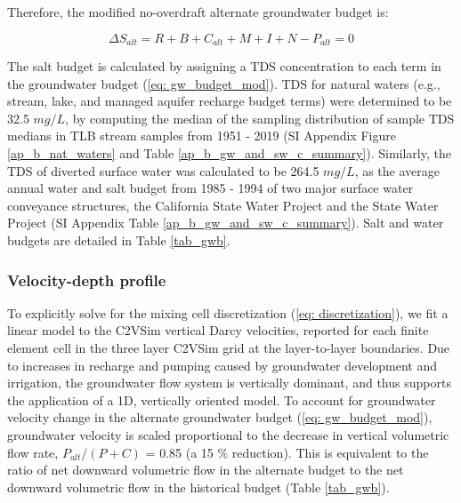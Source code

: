 
Therefore, the modified no-overdraft alternate groundwater budget is:  

\begin{equation}
\Delta S_{alt} = R + B + C_{alt} + M + I + N - P_{alt} = 0
\label{eq: gw_budget_mod}
\end{equation}


The salt budget is calculated by assigning a TDS concentration to each term in the groundwater budget (\ref{eq: gw_budget_mod}). TDS for natural waters (e.g., stream, lake, and managed aquifer recharge budget terms) were determined to be 32.5 $mg/L$, by computing the median of the sampling distribution of sample TDS medians in TLB stream samples \citep{nwis} from 1951 - 2019 (SI Appendix Figure \ref{ap_b_nat_waters} and Table \ref{ap_b_gw_and_sw_c_summary}). Similarly, the TDS of diverted surface water was calculated to be 264.5 $mg/L$, as the average annual water and salt budget from 1985 - 1994 of two major surface water conveyance structures, the California State Water Project and the State Water Project \citep{Cismowski2006} (SI Appendix Table \ref{ap_b_gw_and_sw_c_summary}). Salt and water budgets are detailed in Table \ref{tab_gwb}. 


%
%
\subsubsection{Velocity-depth profile}
\label{ss_2_6}

To explicitly solve for the mixing cell discretization (\ref{eq: discretization}), we fit a linear model to the C2VSim vertical Darcy velocities, reported for each finite element cell in the three layer C2VSim grid at the layer-to-layer boundaries. Due to increases in recharge and pumping caused by groundwater development and irrigation, the groundwater flow system is vertically dominant, and thus supports the application of a 1D, vertically oriented model. To account for groundwater velocity change in the alternate groundwater budget (\ref{eq: gw_budget_mod}), groundwater velocity is scaled proportional to the decrease in vertical volumetric flow rate, $P_{alt}/(P + C)$ = 0.85 (a 15 \% reduction). This is equivalent to the ratio of net downward volumetric flow in the alternate budget to the net downward volumetric flow in the historical budget (Table \ref{tab_gwb}). 

